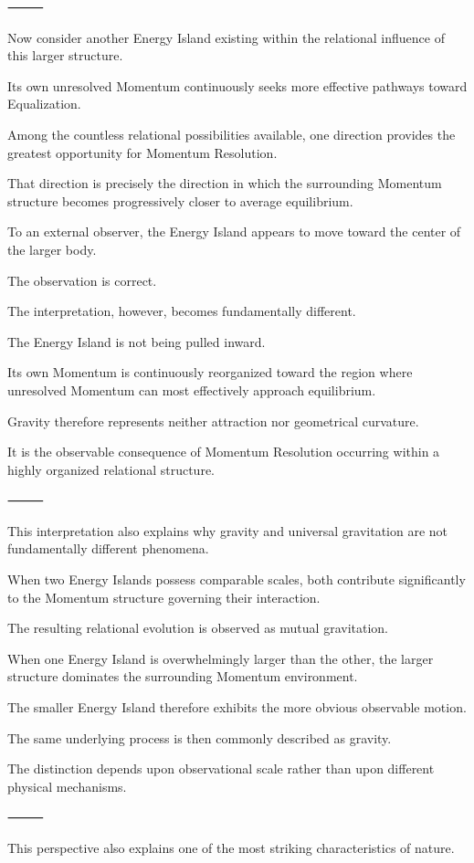 ⸻

Now consider another Energy Island existing within the relational influence of this larger structure.

Its own unresolved Momentum continuously seeks more effective pathways toward Equalization.

Among the countless relational possibilities available, one direction provides the greatest opportunity for Momentum Resolution.

That direction is precisely the direction in which the surrounding Momentum structure becomes progressively closer to average equilibrium.

To an external observer, the Energy Island appears to move toward the center of the larger body.

The observation is correct.

The interpretation, however, becomes fundamentally different.

The Energy Island is not being pulled inward.

Its own Momentum is continuously reorganized toward the region where unresolved Momentum can most effectively approach equilibrium.

Gravity therefore represents neither attraction nor geometrical curvature.

It is the observable consequence of Momentum Resolution occurring within a highly organized relational structure.

⸻

This interpretation also explains why gravity and universal gravitation are not fundamentally different phenomena.

When two Energy Islands possess comparable scales, both contribute significantly to the Momentum structure governing their interaction.

The resulting relational evolution is observed as mutual gravitation.

When one Energy Island is overwhelmingly larger than the other, the larger structure dominates the surrounding Momentum environment.

The smaller Energy Island therefore exhibits the more obvious observable motion.

The same underlying process is then commonly described as gravity.

The distinction depends upon observational scale rather than upon different physical mechanisms.

⸻

This perspective also explains one of the most striking characteristics of nature.

